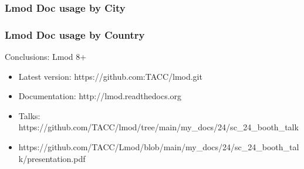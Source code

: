 \documentclass{beamer}
\begin{document}
\begin{frame}[fragile]
    \frametitle{Lmod Doc usage by City}
\end{frame}

\begin{frame}[fragile]
    \frametitle{Lmod Doc usage by Country}
\end{frame}

\begin{frame}{Conclusions: Lmod 8+}
  \begin{itemize}
    \item Latest version: https://github.com:TACC/lmod.git
    \item Documentation:  http://lmod.readthedocs.org
    \item Talks:          https://github.com/TACC/lmod/tree/main/my\_docs/24/sc\_24\_booth\_talk
    \item https://github.com/TACC/Lmod/blob/main/my\_docs/24/sc\_24\_booth\_talk/presentation.pdf
  \end{itemize}
\end{frame}
\end{document}
